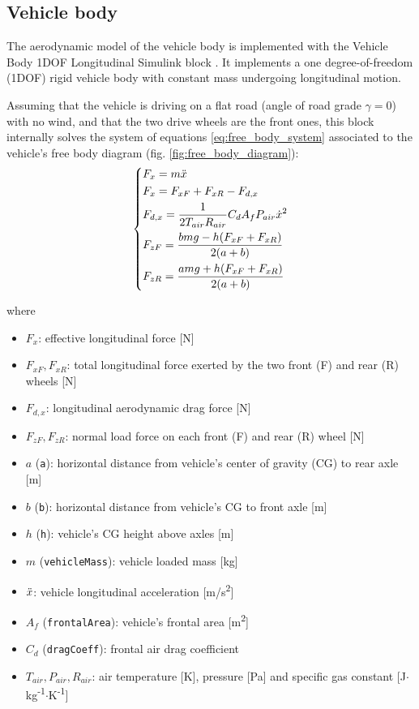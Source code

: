 \subsection{Vehicle body}
\label{sec:body}
The aerodynamic model of the vehicle body is implemented with the Vehicle Body 1DOF Longitudinal Simulink block \cite{mathworks:body}. It implements a one degree-of-freedom (1DOF) rigid vehicle body with constant mass undergoing longitudinal motion.

Assuming that the vehicle is driving on a flat road (angle of road grade $\gamma = 0$) with no wind, and that the two drive wheels are the front ones, this block internally solves the system of equations \ref{eq:free_body_system} associated to the vehicle's free body diagram (fig. \ref{fig:free_body_diagram}):
\begin{equation}
\begin{dcases}
    F_x = m\Ddot{x}\\
    F_x = F_{xF} + F_{xR} - F_{d,x}\\
    F_{d,x} = \frac{1}{2T_{air}R_{air}} C_d A_f P_{air} \dot{x}^2\\
    F_{zF} = \frac{bmg - h (F_{xF} + F_{xR})}{2(a+b)}\\
    F_{zR} = \frac{amg + h (F_{xF} + F_{xR})}{2(a+b)}\\
\end{dcases}
\label{eq:free_body_system}
\end{equation}

where
\begin{itemize}
    \item $F_x$: effective longitudinal force [N]
    \item $F_{xF}, F_{xR}$: total longitudinal force exerted by the two front (F) and rear (R) wheels [N]
    \item $F_{d,x}$: longitudinal aerodynamic drag force [N]
    \item $F_{zF}, F_{zR}$: normal load force on each front (F) and rear (R) wheel [N]
    \item $a$ (\texttt{a}): horizontal distance from vehicle's center of gravity (CG) to rear axle [m]
    \item $b$ (\texttt{b}): horizontal distance from vehicle's CG to front axle [m]
    \item $h$ (\texttt{h}): vehicle's CG height above axles [m]
    \item $m$ (\texttt{vehicleMass}): vehicle loaded mass [kg]
    \item $\Ddot{x}$: vehicle longitudinal acceleration [m/s\textsuperscript{2}]
    \item $A_f$ (\texttt{frontalArea}): vehicle's frontal area [m\textsuperscript{2}]
    \item $C_d$ (\texttt{dragCoeff}): frontal air drag coefficient
    \item $T_{air}, P_{air}, R_{air}$: air temperature [K], pressure [Pa] and specific gas constant [J$\cdot$kg\textsuperscript{-1}$\cdot$K\textsuperscript{-1}]
\end{itemize}

